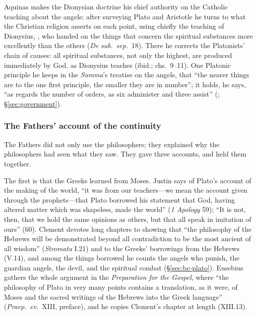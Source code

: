 Aquinas makes the Dionysian doctrine his chief authority on the Catholic
teaching about the angels: after surveying Plato and Aristotle he turns
to what the Christian religion asserts on each point, using chiefly
the teaching of Dionysius, , who handed on the things
that concern the spiritual substances more excellently than the others
(\emph{De sub.\ sep.}\ 18). There he corrects the Platonists' chain of causes: all
spiritual substances, not only the highest, are produced immediately by
God, as Dionysius teaches (ibid.; chs.~9--11). One Platonic principle he
keeps in the \emph{Summa}'s treatise on the angels, that ``the nearer things are to the one
first principle, the smaller they are in number''; it holds, he says,
``as regards the number of orders, as six administer and three assist''
(; \S\ref{sec:government}).

\subsubsection{The Fathers' account of the continuity}\label{sec:bc-fathers-account}

The Fathers did not only use the philosophers; they explained why the
philosophers had seen what they saw. They gave three accounts, and held
them together.

The first is that the Greeks learned from Moses. Justin says of Plato's
account of the making of the world, ``it was from our teachers---we mean
the account given through the prophets---that Plato borrowed his
statement that God, having altered matter which was shapeless, made the
world'' (\emph{1 Apology} 59); ``It is not, then, that we hold the same
opinions as others, but that all speak in imitation of ours'' (60).
Clement devotes long chapters to showing that ``the philosophy of the
Hebrews will be demonstrated beyond all contradiction to be the most
ancient of all wisdom'' (\emph{Stromata} I.21) and to the Greeks'
borrowings from the Hebrews (V.14), and among the
things borrowed he counts the angels who punish, the guardian angels,
the devil, and the spiritual combat (\S\ref{sec:bc-plato}). Eusebius gathers the whole
argument in the \emph{Preparation for the Gospel}, where ``the
philosophy of Plato in very many points contains a translation, as it
were, of Moses and the sacred writings of the Hebrews into the Greek
language'' (\emph{Praep.\ ev.}\ XIII, preface), and he copies Clement's
chapter at length (XIII.13).

